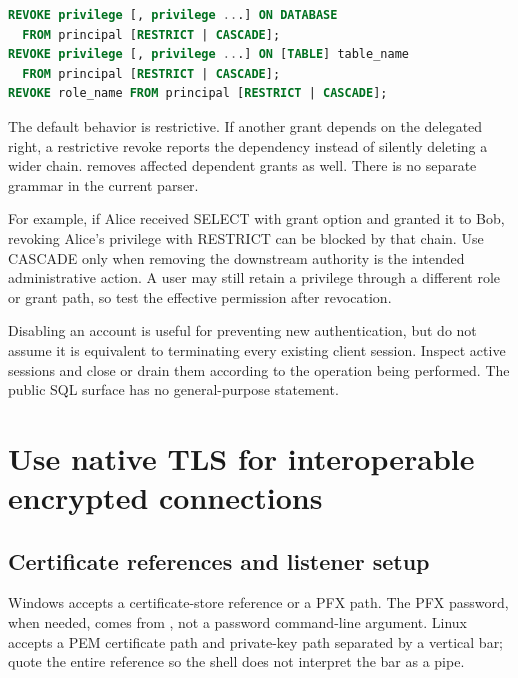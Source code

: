 \begin{lstlisting}[language=SQL]
REVOKE privilege [, privilege ...] ON DATABASE
  FROM principal [RESTRICT | CASCADE];
REVOKE privilege [, privilege ...] ON [TABLE] table_name
  FROM principal [RESTRICT | CASCADE];
REVOKE role_name FROM principal [RESTRICT | CASCADE];
\end{lstlisting}

The default behavior is restrictive. If another grant depends on the
delegated right, a restrictive revoke reports the dependency instead of
silently deleting a wider chain.  removes affected dependent
grants as well. There is no separate 
grammar in the current parser.

For example, if Alice received SELECT with grant option and granted it to
Bob, revoking Alice's privilege with RESTRICT can be blocked by that chain.
Use CASCADE only when removing the downstream authority is the intended
administrative action. A user may still retain a privilege through a different
role or grant path, so test the effective permission after revocation.

Disabling an account is useful for preventing new authentication, but do not
assume it is equivalent to terminating every existing client session. Inspect
active sessions and close or drain them according to the operation being
performed. The public SQL surface has no general-purpose 
statement.


\section{Use native TLS for interoperable encrypted connections}

\subsection{Certificate references and listener setup}

Windows accepts a certificate-store reference or a PFX path. The PFX password,
when needed, comes from , not a
password command-line argument. Linux accepts a PEM certificate path and
private-key path separated by a vertical bar; quote the entire reference so
the shell does not interpret the bar as a pipe.

